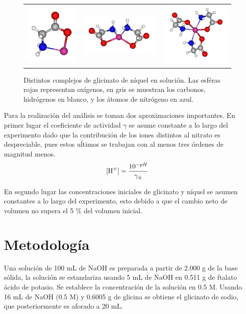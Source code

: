 \documentclass[fleqn,10pt]{SelfArx} %
\begin{document}
	\begin{figure}[h]
		\centering
		\begin{tabular}{ccc}
			\includegraphics[width=0.2\linewidth]{images/Single.png} & \includegraphics[width=0.4\linewidth]{images/Double.png} &
			\includegraphics[width=0.3\linewidth]{images/Triple.png}
		\end{tabular}
		\caption{Distintos complejos de glicinato de n\'iquel en soluci\'on. Las esf\'eras rojas representan ox\'igenos, en gris se muestran los carbonos, hidr\'ogenos en blanco, y los \'atomos de nitr\'ogeno en azul.}
		\label{fig:ligands}
	\end{figure} 
	
	Para la realizaci\'on del an\'alisis se toman dos aproximaciones importantes. En primer lugar el coeficiente de actividad $\gamma$ se asume constante a lo largo del experimento dado que la contribuci\'on de los iones distintos al nitrato es despreciable, pues estos u\'ltimos se trabajan con al menos tres \'ordenes de magnitud menos.
	\begin{equation}
	\ce{[H+]} = \dfrac{10^{-pH}}{\gamma_\pm}
	\end{equation}
	
	En segundo lugar las concentraciones iniciales de glicinato y n\'iquel se asumen constantes a lo largo del experimento, esto debido a que el cambio neto de volumen no supera el 5 \% del volumen inicial.
	
	
	\section{Metodolog\'ia}
	Una soluci\'on de 100 mL de NaOH es preparada a partir de 2.000 g de la base s\'olida, la soluci\'on se estandariza usando 5 mL de NaOH en 0.511 g de ftalato \'acido de potasio. Se establece la concentraci\'on de la soluci\'on en 0.5 M. Usando  16 mL de NaOH (0.5 M) y 0.6005 g de glicina se obtiene el glicinato de sodio, que posteriormente es aforado a 20 mL.
	
\end{document}

